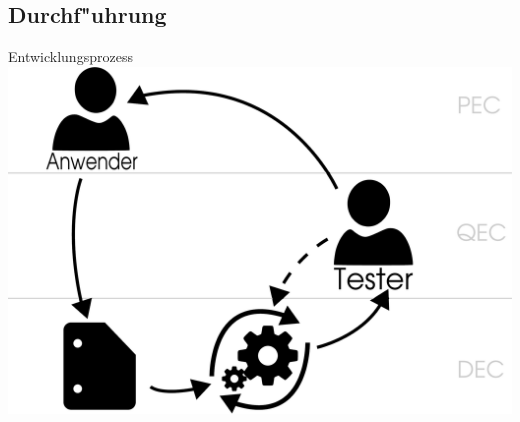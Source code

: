 \subsection{Durchf"uhrung}
\begin{frame}{Entwicklungsprozess}
 \includegraphics[width=\textwidth]{FDD}
\end{frame}
